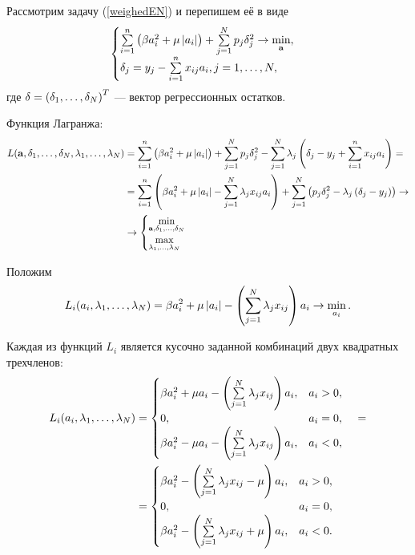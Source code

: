Рассмотрим задачу (\ref{weighedEN}) и перепишем её в виде
\begin{equation}
	\label{weighedENdelta}
	\begin{cases}
		\sum\limits_{i=1}^n\left(\beta a_i^2 + \mu \left|a_i\right|\right) 
	+ \sum\limits_{j=1}^N p_j\delta_j^2 \to \mathop{\mbox{min}}\limits_{\boldsymbol{\mathbf{a}}}, \\
	\delta_j = y_j - \sum\limits_{i=1}^nx_{ij}a_i, j=1,\ldots,N,
	\end{cases}
\end{equation}
где $\delta = \left(\delta_1, \ldots, \delta_N\right)^T$ --- вектор регрессионных остатков.

Функция Лагранжа:
\begin{equation}
	\label{LagrWEN}
	\begin{split}
		L(\boldsymbol{\mathbf{a}},\delta_{1},\ldots,\delta_{N}, \lambda_{1},\ldots,\lambda_{N}) 
	&= \sum\limits_{i=1}^n\left(\beta a_i^2 + \mu \left|a_i\right|\right) + \sum\limits_{j=1}^N p_j\delta_j^2 - \sum_{j=1}^N\lambda_j\left(\delta_j - y_j + \sum\limits_{i=1}^nx_{ij}a_i\right) = \\
	&= \sum\limits_{i=1}^n\left(\beta a_i^2 + \mu \left|a_i\right| - \sum\limits_{j=1}^N\lambda_jx_{ij}a_i\right) + \sum\limits_{j=1}^N \left(p_j\delta_j^2  - \lambda_j\left(\delta_j - y_j\right)\right) \to \\
	&\to 
	\begin{cases}
		\mathop{\mbox{min}}\limits_{\boldsymbol{\mathbf{a}},\delta_{1},\ldots,\delta_{N}}\\
		\mathop{\mbox{max}}\limits_{\lambda_{1},\ldots,\lambda_{N}}\\
	\end{cases}
	\end{split}
\end{equation}



\def\LiPart{L_i(a_i,\idots \lambda1N)}
\def\sumLambdaX{\suml_{j=1}^N\lambda_jx_{ij}}
\newcommand\diag[1]{\text{diag}\cbr{#1}}
Положим 
\begin{equation}
	\label{partialLagr}
	\LiPart = \beta a_i^2 + \mu \modul{a_i} - \cbr{\sumLambdaX}a_i \to \min_{a_i}.
\end{equation}

Каждая из функций $L_i$ является кусочно заданной комбинаций двух квадратных трехчленов:
\begin{equation}
	\label{partialLagrParted}
	\begin{split}
		\LiPart 
		&= \begin{cases}
			\beta a_i^2 + \mu a_i - \cbr{\sumLambdaX}a_i, &a_i > 0,\\
			0, &a_i = 0,\\
			\beta a_i^2 - \mu a_i - \cbr{\sumLambdaX}a_i, &a_i < 0,\\
		\end{cases} \quad= \\
		&= \begin{cases}
			\beta a_i^2 - \cbr{\sumLambdaX-\mu}a_i, &a_i > 0,\\
			0, &a_i = 0,\\
			\beta a_i^2 - \cbr{\sumLambdaX+\mu}a_i, &a_i < 0.\\
		\end{cases}	
	\end{split}
\end{equation}

